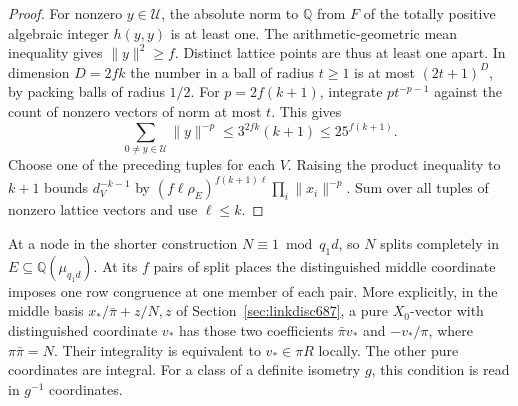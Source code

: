 \documentclass[a4paper,11pt]{article}
\theoremstyle{definition}
\theoremstyle{remark}
\numberwithin{equation}{section}
\begin{document}
\begin{proof}
For nonzero \(y\in\mathcal U\), the absolute norm to
\(\mathbb Q\) from \(F\) of the totally positive algebraic
integer \(h(y,y)\) is at least one. The arithmetic-geometric
mean inequality gives \(\|y\|^2\ge f\). Distinct lattice
points are thus at least one apart. In dimension \(D=2fk\)
the number in a ball of radius \(t\ge1\) is at most
\((2t+1)^D\), by packing balls of radius \(1/2\).
For \(p=2f(k+1)\), integrate \(p t^{-p-1}\) against the
count of nonzero vectors of norm at most \(t\). This gives
\[
     \sum_{0\ne y\in\mathcal U}\|y\|^{-p}
          \le 3^{2fk}(k+1)\le25^{f(k+1)} .
\]
Choose one of the preceding tuples for each \(V\).
Raising the product inequality to \(k+1\) bounds \(d_V^{-k-1}\)
by \((f\ell\rho_E)^{f(k+1)\ell}\prod_i\|x_i\|^{-p}\).
Sum over all tuples of nonzero lattice vectors and use
\(\ell\le k\).
\end{proof}

At a node in the shorter construction \(N\equiv1\bmod q_1d\),
so \(N\) splits completely in \(E\subseteq\mathbb Q(\mu_{q_1d})\).
At its \(f\) pairs of split places the distinguished middle
coordinate imposes one row congruence at one member of each pair.
More explicitly, in the middle basis \(x_*/\bar\pi+z/N,z\)
of Section~\ref{sec:linkdisc687}, a pure \(X_0\)-vector with
distinguished coordinate \(v_*\) has those two coefficients
\(\bar\pi v_*\) and \(-v_*/\pi\), where \(\pi\bar\pi=N\).
Their integrality is equivalent to \(v_*\in\pi R\) locally.
The other pure coordinates are integral. For a class of a
definite isometry \(g\), this condition is read in \(g^{-1}\)
coordinates.
\end{document}
